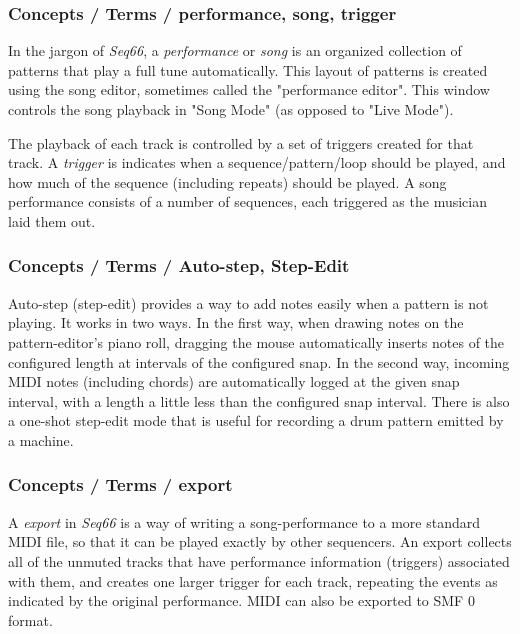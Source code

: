 \subsubsection{Concepts / Terms / performance, song, trigger}
\label{subsubsec:concepts_terms_performance}

   In the jargon of \textsl{Seq66}, a
   \textsl{performance} or
   \textsl{song} is an organized collection of patterns that play a full tune
   automatically.
   This layout of patterns is created using the song editor, sometimes
   called the "performance editor".
   This window controls the song playback in "Song Mode"
   (as opposed to "Live Mode").

   The playback of each track is controlled by a set of triggers created for
   that track.
   A \textsl{trigger} is indicates when a sequence/pattern/loop
   should be played, and how much of the sequence (including repeats) should be
   played.  A song performance consists of a number of sequences, each
   triggered as the musician laid them out.

\subsubsection{Concepts / Terms / Auto-step, Step-Edit}
\label{subsubsec:concepts_terms_auto_step}

   Auto-step (step-edit) provides a way to add notes easily when a pattern is
   not playing.  It works in two ways.  In the first way, when drawing notes on
   the pattern-editor's piano roll, dragging the mouse automatically inserts
   notes of the configured length at intervals of the configured snap.
   In the second way, incoming MIDI notes (including chords)
   are automatically logged at the given snap interval, with a length a little
   less than the configured snap interval.
   There is also a one-shot step-edit mode that is useful for recording a drum
   pattern emitted by a machine.

\subsubsection{Concepts / Terms / export}
\label{subsubsec:concepts_terms_export}

   A \textsl{export} in \textsl{Seq66} is a way of writing a
   song-performance to a more standard MIDI file, so that it can be played
   exactly by other sequencers.
   An export collects all of the unmuted tracks that have
   performance information (triggers) associated with them, and creates one
   larger trigger for each track, repeating the events as indicated by the
   original performance.
   MIDI can also be exported to SMF 0 format.

